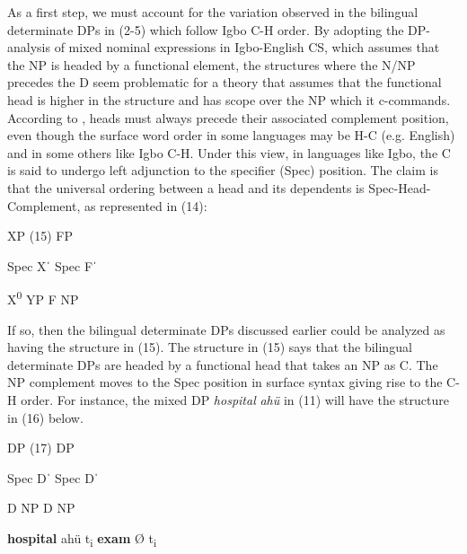 \documentclass[output=paper]{langsci/langscibook}
\begin{document}
As a first step, we must account for the variation observed in the bilingual determinate DPs in (2-5) which follow Igbo C-H order. By adopting the DP-analysis of mixed nominal expressions in Igbo-English CS, which assumes that the NP is headed by a functional element, the structures where the N/NP precedes the D seem problematic for a theory that assumes that the functional head is higher in the structure and has scope over the NP which it c-commands. According to \citet{Kayne1994}, heads must always precede their associated complement position, even though the surface word order in some languages may be H-C (e.g. English) and in some others like Igbo C-H. Under this view, in languages like Igbo, the C is said to undergo left adjunction to the specifier (Spec) position. The claim is that the universal ordering between a head and its dependents is Spec-Head-Complement, as represented in (14):

\ea%
    \label{ex:14}
 

	      XP      (15)    FP

Spec    Xˈ      Spec    Fˈ

      X\textsuperscript{0    }YP      F    NP        
\z

If so, then the bilingual determinate DPs discussed earlier could be analyzed as having the structure in (15). The structure in (15) says that the bilingual determinate DPs are headed by a functional head that takes an NP as C. The NP complement moves to the Spec position in surface syntax giving rise to the C-H order. For instance, the mixed DP \textit{hospital}\textbf{\textit{ }}\textit{ahü} in (11) will have the structure in (16) below.

\ea%

	    DP        (17)    DP

  Spec       Dˈ      Spec      Dˈ

      D    NP        D    NP
\z

         \textbf{hospital}            ahü     t\textsubscript{i    }\textbf{exam    }Ø    t\textsubscript{i}
\end{document}
